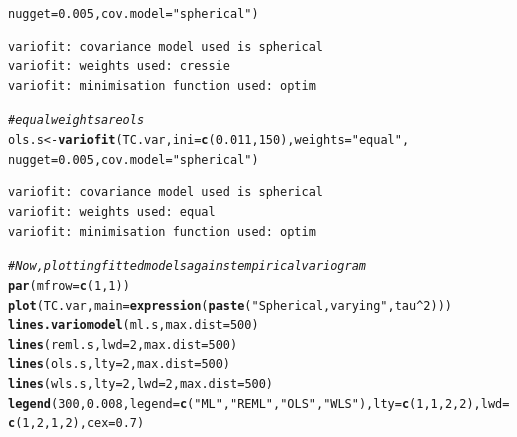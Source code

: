 \documentclass{article}\usepackage[]{graphicx}\usepackage[]{color}
\makeatletter
\newcommand{\hlnum}[1]{\textcolor[rgb]{0.686,0.059,0.569}{#1}}%
\newcommand{\hlstr}[1]{\textcolor[rgb]{0.192,0.494,0.8}{#1}}%
\newcommand{\hlcom}[1]{\textcolor[rgb]{0.678,0.584,0.686}{\textit{#1}}}%
\newcommand{\hlopt}[1]{\textcolor[rgb]{0,0,0}{#1}}%
\newcommand{\hlstd}[1]{\textcolor[rgb]{0.345,0.345,0.345}{#1}}%
\newcommand{\hlkwb}[1]{\textcolor[rgb]{0.69,0.353,0.396}{#1}}%
\newcommand{\hlkwc}[1]{\textcolor[rgb]{0.333,0.667,0.333}{#1}}%
\newcommand{\hlkwd}[1]{\textcolor[rgb]{0.737,0.353,0.396}{\textbf{#1}}}%
\newenvironment{kframe}{%
 \def\at@end@of@kframe{}%
 \ifinner\ifhmode%
  \def\at@end@of@kframe{\end{minipage}}%
  \begin{minipage}{\columnwidth}%
 \fi\fi%
 \def\FrameCommand##1{\hskip\@totalleftmargin \hskip-\fboxsep
 \colorbox{shadecolor}{##1}\hskip-\fboxsep
     \hskip-\linewidth \hskip-\@totalleftmargin \hskip\columnwidth}%
 \MakeFramed {\advance\hsize-\width
   \@totalleftmargin\z@ \linewidth\hsize
   \@setminipage}}%
 {\par\unskip\endMakeFramed%
 \at@end@of@kframe}
\newenvironment{knitrout}{}{} %
\makeatother
\begin{document}
\begin{enumerate}
\begin{enumerate}
\begin{knitrout}
\begin{kframe}
\begin{alltt}
                  \hlkwc{nugget}\hlstd{=}\hlnum{0.005}\hlstd{,} \hlkwc{cov.model} \hlstd{=} \hlstr{"spherical"}\hlstd{)}
\end{alltt}
\begin{verbatim}
variofit: covariance model used is spherical 
variofit: weights used: cressie 
variofit: minimisation function used: optim 
\end{verbatim}
\begin{alltt}
\hlcom{# equal weights are ols}
\hlstd{ols.s} \hlkwb{<-} \hlkwd{variofit}\hlstd{(TC.var,} \hlkwc{ini} \hlstd{=} \hlkwd{c}\hlstd{(}\hlnum{0.011}\hlstd{,}\hlnum{150}\hlstd{),} \hlkwc{weights} \hlstd{=} \hlstr{"equal"}\hlstd{,}
                  \hlkwc{nugget}\hlstd{=}\hlnum{0.005}\hlstd{,} \hlkwc{cov.model} \hlstd{=} \hlstr{"spherical"}\hlstd{)}
\end{alltt}
\begin{verbatim}
variofit: covariance model used is spherical 
variofit: weights used: equal 
variofit: minimisation function used: optim 
\end{verbatim}
\begin{alltt}
\hlcom{# Now, plotting fitted models against empirical variogram}
\hlkwd{par}\hlstd{(}\hlkwc{mfrow} \hlstd{=} \hlkwd{c}\hlstd{(}\hlnum{1}\hlstd{,}\hlnum{1}\hlstd{))}
\hlkwd{plot}\hlstd{(TC.var,} \hlkwc{main} \hlstd{=} \hlkwd{expression}\hlstd{(}\hlkwd{paste}\hlstd{(}\hlstr{"Spherical, varying "}\hlstd{, tau}\hlopt{^}\hlnum{2}\hlstd{)))}
\hlkwd{lines.variomodel}\hlstd{(ml.s,} \hlkwc{max.dist} \hlstd{=} \hlnum{500}\hlstd{)}
\hlkwd{lines}\hlstd{(reml.s,} \hlkwc{lwd} \hlstd{=} \hlnum{2}\hlstd{,} \hlkwc{max.dist} \hlstd{=} \hlnum{500}\hlstd{)}
\hlkwd{lines}\hlstd{(ols.s,} \hlkwc{lty} \hlstd{=} \hlnum{2}\hlstd{,} \hlkwc{max.dist} \hlstd{=} \hlnum{500}\hlstd{)}
\hlkwd{lines}\hlstd{(wls.s,} \hlkwc{lty} \hlstd{=} \hlnum{2}\hlstd{,} \hlkwc{lwd} \hlstd{=} \hlnum{2}\hlstd{,} \hlkwc{max.dist} \hlstd{=} \hlnum{500}\hlstd{)}
\hlkwd{legend}\hlstd{(}\hlnum{300}\hlstd{,} \hlnum{0.008}\hlstd{,} \hlkwc{legend}\hlstd{=}\hlkwd{c}\hlstd{(}\hlstr{"ML"}\hlstd{,}\hlstr{"REML"}\hlstd{,}\hlstr{"OLS"}\hlstd{,}\hlstr{"WLS"}\hlstd{),}\hlkwc{lty}\hlstd{=}\hlkwd{c}\hlstd{(}\hlnum{1}\hlstd{,}\hlnum{1}\hlstd{,}\hlnum{2}\hlstd{,}\hlnum{2}\hlstd{),}\hlkwc{lwd}\hlstd{=}\hlkwd{c}\hlstd{(}\hlnum{1}\hlstd{,}\hlnum{2}\hlstd{,}\hlnum{1}\hlstd{,}\hlnum{2}\hlstd{),} \hlkwc{cex}\hlstd{=}\hlnum{0.7}\hlstd{)}
\end{alltt}
\end{kframe}


\end{knitrout}
\end{enumerate}
\end{enumerate}
\end{document}
